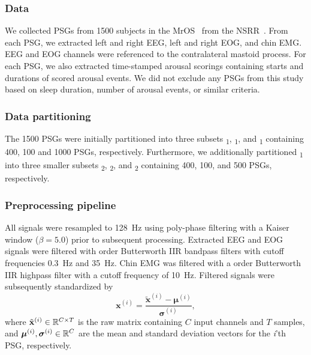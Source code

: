 \subsubsection{Data}
We collected \acp{PSG} from \num{1500} subjects in the \acl{MrOS}~\cite{Blank2005, Orwoll2005, Blackwell2011} from the \ac{NSRR}~\cite{Dean2016, Zhang2018}.
From each \ac{PSG}, we extracted left and right \ac{EEG}, left and right \ac{EOG}, and chin \ac{EMG}.
\ac{EEG} and \ac{EOG} channels were referenced to the contralateral mastoid process.
For each \ac{PSG}, we also extracted time-stamped arousal scorings containing starts and durations of scored arousal events.
We did not exclude any \acp{PSG} from this study based on sleep duration, number of arousal events, or similar criteria.

\subsubsection{Data partitioning}
The 1500 \acp{PSG} were initially partitioned into three subsets \train{}\textsubscript{1}, \eval{}\textsubscript{1}, and \test{}\textsubscript{1} containing 400, 100 and 1000 \acp{PSG}, respectively.
Furthermore, we additionally partitioned \test{}\textsubscript{1} into three smaller subsets \train{}\textsubscript{2}, \eval{}\textsubscript{2}, and \test{}\textsubscript{2} containing 400, 100, and 500 \acp{PSG}, respectively.

\subsubsection{Preprocessing pipeline}
All signals were resampled to \SI{128}{\hertz} using poly-phase filtering with a Kaiser window ($\beta = \num{5.0}$) prior to subsequent processing.
Extracted \ac{EEG} and \ac{EOG} signals were filtered with  order Butterworth IIR bandpass filters with cutoff frequencies \SI{0.3}{\hertz} and \SI{35}{\hertz}. 
Chin \ac{EMG} was filtered with a  order Butterworth IIR highpass filter with a cutoff frequency of \SI{10}{\hertz}.
Filtered signals were subsequently standardized by 
\begin{equation}
    \mathbf{x}^{(i)} = \frac{\tilde{\mathbf{x}}^{(i)} - \boldsymbol{\mu}^{(i)}}{\boldsymbol{\sigma}^{(i)}},
\end{equation}
where $\tilde{\mathbf{x}}^{(i)} \in \mathbb{R}^{C \times T}$ is the raw matrix containing $C$ input channels and $T$ samples, and $\boldsymbol{\mu}^{(i)}, \boldsymbol{\sigma}^{(i)} \in \mathbb{R}^{C}$ are the mean and standard deviation vectors for the \textit{i}'th \ac{PSG}, respectively.


